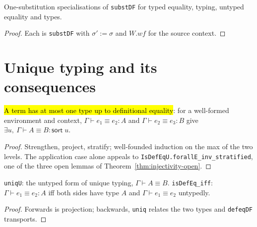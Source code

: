 \begin{lemma}
\label{fam:subst-corollaries}
\leanok
{}

 One-substitution specialisations of \texttt{substDF} for typed equality,
typing, untyped equality and types.
\end{lemma}
\begin{proof}
\leanok
{} Each is \texttt{substDF} with $\sigma':=\sigma$ and $W.wf$ for the source context.
\end{proof}

\section{Unique typing and its consequences}

\begin{theorem}
\label{thm:unique-typing}
\leanok
{}

 \hl{A term has at most one type up to definitional equality}: for a well-formed
environment and context, $\Gamma\vdash e_1\equiv e_2:A$ and $\Gamma\vdash e_2\equiv e_3:B$ give
$\exists u,\ \Gamma\vdash A\equiv B:\mathsf{sort}\;u$. \stTainted{}
\end{theorem}
\begin{proof}
\leanok
{} Strengthen, project, stratify; well-founded induction on the max of the two levels.
The application case alone appeals to \texttt{IsDefEqU.forallE\_inv\_stratified}, one of the
three open \stSorry{} lemmas of Theorem~\ref{thm:injectivity-open}.
\end{proof}

\begin{theorem}
\label{thm:isdefeq-iff}
\leanok
{}

 \texttt{uniqU}: the untyped form of unique typing, $\Gamma\vdash A\equiv B$.
\texttt{isDefEq\_iff}: $\Gamma\vdash e_1\equiv e_2:A$ iff both sides have type $A$ and
$\Gamma\vdash e_1\equiv e_2$ untypedly.
\end{theorem}
\begin{proof}
\leanok
{} Forwards is projection; backwards, \texttt{uniq} relates the two types and
\texttt{defeqDF} transports.
\end{proof}

